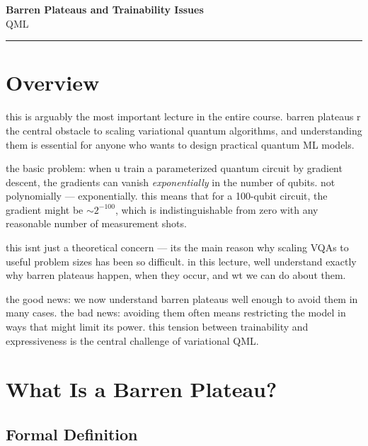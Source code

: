 \documentclass[11pt,a4paper]{article}
\theoremstyle{definition}
\theoremstyle{remark}
\begin{document}
\begin{center}
    {\LARGE \textbf{Barren Plateaus and Trainability Issues}}\\[8pt]
    {\large QML}\\[12pt]
    \hrule
\end{center}

\vspace{12pt}
\tableofcontents
\newpage

\section{Overview}

this is arguably the most important lecture in the entire course. barren plateaus r the central obstacle to scaling variational quantum algorithms, and understanding them is essential for anyone who wants to design practical quantum ML models.

the basic problem: when u train a parameterized quantum circuit by gradient descent, the gradients can vanish \emph{exponentially} in the number of qubits. not polynomially --- exponentially. this means that for a 100-qubit circuit, the gradient might be $\sim 2^{-100}$, which is indistinguishable from zero with any reasonable number of measurement shots.

this isnt just a theoretical concern --- its the main reason why scaling VQAs to useful problem sizes has been so difficult. in this lecture, well understand exactly why barren plateaus happen, when they occur, and wt we can do about them.

the good news: we now understand barren plateaus well enough to avoid them in many cases. the bad news: avoiding them often means restricting the model in ways that might limit its power. this tension between trainability and expressiveness is the central challenge of variational QML.

\section{What Is a Barren Plateau?}

\subsection{Formal Definition}
\end{document}
